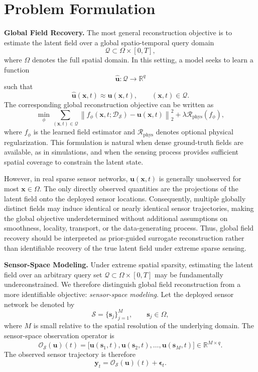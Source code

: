 \section{Problem Formulation}

\textbf{Global Field Recovery.}
The most general reconstruction objective is to estimate the latent field over a global spatio-temporal query domain
\[
\mathcal{Q} \subset \Omega \times [0,T],
\]
where $\Omega$ denotes the full spatial domain. In this setting, a model seeks to learn a function
\[
\hat{\mathbf{u}}:
\mathcal{Q} \rightarrow \mathbb{R}^q
\]
such that
\[
\hat{\mathbf{u}}(\mathbf{x},t) \approx \mathbf{u}(\mathbf{x},t),
\qquad
(\mathbf{x},t)\in\mathcal{Q}.
\]
The corresponding global reconstruction objective can be written as
\[
\min_{\phi}
\sum_{(\mathbf{x},t)\in\mathcal{Q}}
\left\|
f_{\phi}(\mathbf{x},t;\mathcal{D}_{\mathcal{S}})
-
\mathbf{u}(\mathbf{x},t)
\right\|_2^2
+
\lambda \mathcal{R}_{\mathrm{phys}}(f_{\phi}),
\]
where $f_{\phi}$ is the learned field estimator and $\mathcal{R}_{\mathrm{phys}}$ denotes optional physical regularization. This formulation is natural when dense ground-truth fields are available, as in simulations, and when the sensing process provides sufficient spatial coverage to constrain the latent state.

However, in real sparse sensor networks, $\mathbf{u}(\mathbf{x},t)$ is generally unobserved for most $\mathbf{x}\in\Omega$. The only directly observed quantities are the projections of the latent field onto the deployed sensor locations. Consequently, multiple globally distinct fields may induce identical or nearly identical sensor trajectories, making the global objective underdetermined without additional assumptions on smoothness, locality, transport, or the data-generating process. Thus, global field recovery should be interpreted as prior-guided surrogate reconstruction rather than identifiable recovery of the true latent field under extreme sparse sensing.


\textbf{Sensor-Space Modeling.} Under extreme spatial sparsity, estimating the latent field over an arbitrary query set
$\mathcal{Q} \subset \Omega \times [0,T]$ may be fundamentally underconstrained. We therefore distinguish global field reconstruction from a more identifiable objective: \emph{sensor-space modeling}. Let the deployed sensor network be denoted by
\[
\mathcal{S} = \{\mathbf{s}_j\}_{j=1}^{M}, \qquad \mathbf{s}_j \in \Omega,
\]
where $M$ is small relative to the spatial resolution of the underlying domain. The sensor-space observation operator is
\[
\mathcal{O}_{\mathcal{S}}(\mathbf{u})(t)
=
\big[
\mathbf{u}(\mathbf{s}_1,t),
\mathbf{u}(\mathbf{s}_2,t),
\dots,
\mathbf{u}(\mathbf{s}_M,t)
\big]
\in \mathbb{R}^{M \times q}.
\]
The observed sensor trajectory is therefore
\[
\mathbf{y}_t
=
\mathcal{O}_{\mathcal{S}}(\mathbf{u})(t)
+
\boldsymbol{\epsilon}_t.
\]


